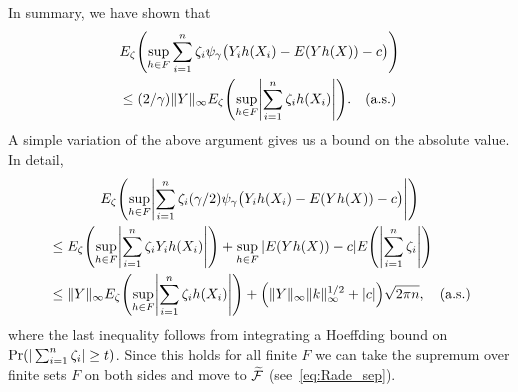 \documentclass[10pt]{amsart}
\theoremstyle{definition}\newtheorem{defi}[theo]{Definition}\newtheorem{rema}[theo]{Remark}\newtheorem{exam}[theo]{Example}\newtheorem{exem}[theo]{Example}\newtheorem{nota}[theo]{Notation}
\theoremstyle{remark}
\newcommand{\clF}{\mathcal{F}}
\let\oldtilde\tilde
\renewcommand*{\tilde}[1]{\mathchoice{\widetilde{#1}}{\widetilde{#1}}{\oldtilde{#1}}{\oldtilde{#1}}}
\let\originalleft\left
\let\originalright\right
\renewcommand{\left}{\mathopen{}\mathclose\bgroup\originalleft}
\renewcommand{\right}{\aftergroup\egroup\originalright}
\begin{document}
In summary, we have shown that
\begin{multline*}
E_\zeta \left(
\sup_{h \in F} \sum_{i=1}^n \zeta_i \psi_\gamma\bigl(Y_i h(X_i) - E(Y h(X)) - c\bigr) \right) \\
\leq (2/\gamma) \|Y\|_\infty E_\zeta\left(\sup_{h \in F} \left| \sum_{i=1}^n \zeta_i h(X_i) \right| \right). \text{\quad (a.s.)}
\end{multline*}
A simple variation of the above argument gives us a bound on the absolute value. In detail,
\begin{multline}\label{eq:Rademacher_for_function}
E_\zeta \left(
\sup_{h \in F} \left| \sum_{i=1}^n \zeta_i (\gamma/2) \psi_\gamma\bigl(Y_i h(X_i) - E(Y h(X)) - c\bigr) \right|\right)  \\
\begin{aligned}
&\leq E_\zeta \left(\sup_{h \in F} \left| \sum_{i=1}^n \zeta_i Y_i h(X_i) \right| \right) + \sup_{h\in F} |E(Yh(X)) - c| E\left(\left|\sum_{i=1}^n \zeta_i\right|\right)  \\
&\leq \|Y\|_\infty E_\zeta \left(\sup_{h \in F} \left| \sum_{i=1}^n \zeta_i h(X_i) \right| \right) + \left(\|Y\|_\infty \|k\|_\infty^{1/2} + |c|\right) \sqrt{2\pi n},
\text{\quad (a.s.)}
\end{aligned}
\end{multline}
where the last inequality follows from integrating a Hoeffding bound on $\Pr(|\sum_{i=1}^n\linebreak \zeta_i| \geq t)$. Since this holds for all finite $F$ we can take the supremum over finite sets $F$ on both sides and move to $\tilde{\clF}$ (see~\eqref{eq:Rade_sep}).
\end{document}
